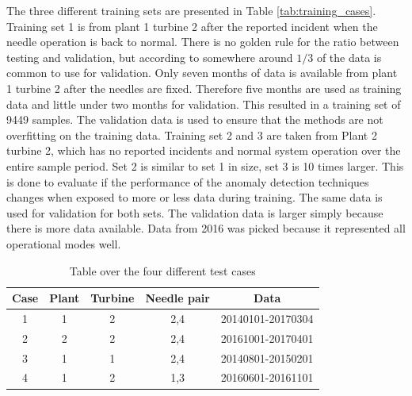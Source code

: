         The three different training sets are presented in Table \ref{tab:training_cases}. Training set 1 is from plant 1 turbine 2 after the reported incident when the needle operation is back to normal. There is no golden rule for the ratio between testing and validation, but according to \cite{Kohavi1995} somewhere around $1/3$ of the data is common to use for validation. Only seven months of data is available from plant 1 turbine 2 after the needles are fixed. Therefore five months are used as training data and little under two months for validation. This resulted in a training set of 9449 samples. The validation data is used to ensure that the methods are not overfitting on the training data. Training set 2 and 3 are taken from Plant 2 turbine 2, which has no reported incidents and normal system operation over the entire sample period. Set 2 is similar to set 1 in size, set 3 is 10 times larger. This is done to evaluate if the performance of the anomaly detection techniques changes when exposed to more or less data during training. The same data is used for validation for both sets. The validation data is larger simply because there is more data available. Data from 2016 was picked because it represented all operational modes well. 
        
        \begin{table}[]
            \centering
            \begin{tabular}{ccccc}
                \toprule
                \textbf{Case}    & \textbf{Plant} & \textbf{Turbine}   & \textbf{Needle pair}   & \textbf{Data}               \\ \midrule
                1       & 1     & 2         & 2,4           & 20140101-20170304     \\ 
                2       & 2     & 2         & 2,4           & 20161001-20170401     \\ 
                3       & 1     & 1         & 2,4           & 20140801-20150201     \\ 
                4       & 1     & 2         & 1,3           & 20160601-20161101     \\ \bottomrule
            \end{tabular}
            \caption{Table over the four different test cases}
            \label{tab:test_cases}
        \end{table}
        
